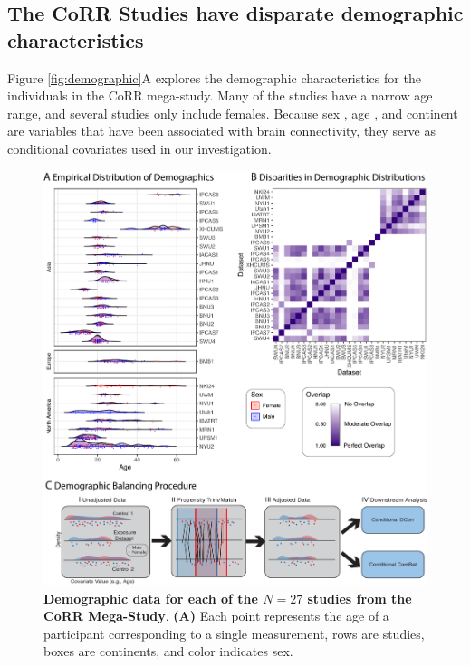 \subsection{The CoRR Studies have disparate demographic characteristics}
\label{sec:demo}
Figure \ref{fig:demographic}A  explores the demographic characteristics for the individuals in the CoRR mega-study. Many of the studies have a narrow age range, and several studies only include females. Because sex \cite{Weis2020Mar,Ingalhalikar2014Jan,Satterthwaite2015Sep}, age \cite{Varangis2019,Sala-Llonch2015,Hampson2012Sep}, and continent \cite{Misiura2020} are variables that have been associated with brain connectivity, they serve as conditional covariates used in our investigation.

\begin{figure}[h]
    \centering
    \includegraphics[width=\linewidth]{Figures/Content/demographic.pdf}
    \caption{\textbf{Demographic data for each of the $N=27$ studies from the CoRR Mega-Study}. \textbf{(A)}  Each point represents the age of a participant corresponding to a single measurement, rows are studies, boxes are continents, and color indicates sex. 
}
\end{figure}
